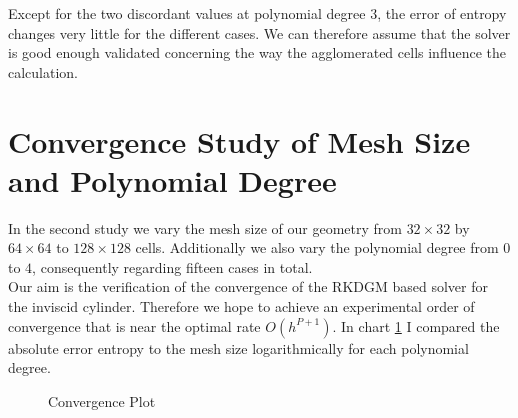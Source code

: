 	Except for the two discordant values at polynomial degree $3$, the error of entropy changes very little for the different cases. We can therefore assume that the solver is good enough validated concerning the way the agglomerated cells influence the calculation. 
	
	\section{Convergence Study of Mesh Size and Polynomial Degree}
	
	In the second study we vary the mesh size of our geometry from $32 \times 32$ by $64 \times 64$ to $128 \times 128$ cells. Additionally we also vary the polynomial degree from $0$ to $4$, consequently regarding fifteen cases in total. \\
	Our aim is the verification of the convergence of the RKDGM based solver for the inviscid cylinder. Therefore we hope to achieve an experimental order of convergence that is near the optimal rate $O(h^{P+1})$. In chart \ref{mesherror} I compared the absolute error entropy to the mesh size logarithmically for each polynomial degree. 	
	\begin{figure}[htp]
		\centering		
		\caption{Convergence Plot}
		\label{mesherror}
	\end{figure}

